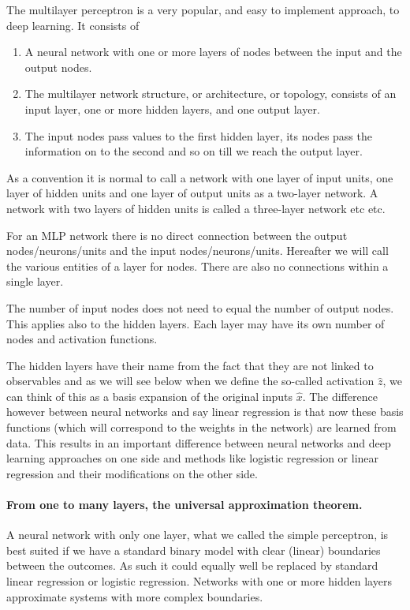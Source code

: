 The multilayer perceptron is a very popular, and easy to implement approach, to deep learning. It consists of
\begin{enumerate}
\item A neural network with one or more layers of nodes between the input and the output nodes.

\item The multilayer network structure, or architecture, or topology, consists of an input layer, one or more hidden layers, and one output layer.

\item The input nodes pass values to the first hidden layer, its nodes pass the information on to the second and so on till we reach the output layer.
\end{enumerate}

\noindent
As a convention it is normal to call  a  network with one layer of input units, one layer of hidden
units and one layer of output units as  a two-layer network. A network with two layers of hidden units is called a three-layer network etc etc.

For an MLP network there is no direct connection between the output nodes/neurons/units and  the input nodes/neurons/units.
Hereafter we will call the various entities of a layer for nodes.
There are also no connections within a single layer.

The number of input nodes does not need to equal the number of output
nodes. This applies also to the hidden layers. Each layer may have its
own number of nodes and activation functions.

The hidden layers have their name from the fact that they are not
linked to observables and as we will see below when we define the
so-called activation $\hat{z}$, we can think of this as a basis
expansion of the original inputs $\hat{x}$. The difference however
between neural networks and say linear regression is that now these
basis functions (which will correspond to the weights in the network)
are learned from data. This results in  an important difference between
neural networks and deep learning approaches on one side and methods
like logistic regression or linear regression and their modifications on the other side.

\paragraph{From one to many layers, the universal approximation theorem.}
A neural network with only one layer, what we called the simple
perceptron, is best suited if we have a standard binary model with
clear (linear) boundaries between the outcomes. As such it could
equally well be replaced by standard linear regression or logistic
regression. Networks with one or more hidden layers approximate
systems with more complex boundaries.

